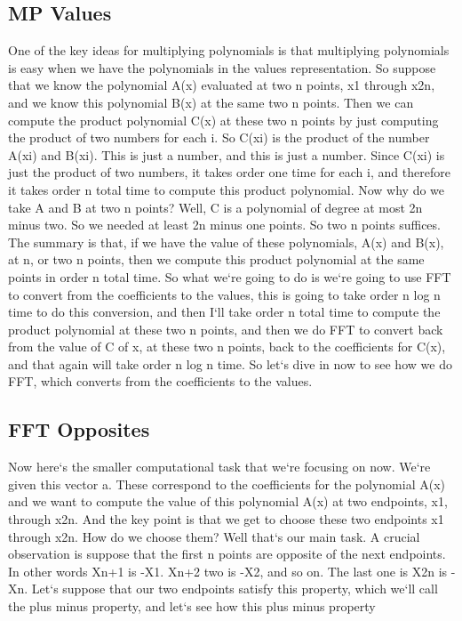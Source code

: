 \subsection{MP  Values}
One of the key ideas for multiplying polynomials is that multiplying polynomials is easy when we have the polynomials in the values representation.
So suppose that we know the polynomial A(x) evaluated at two n points, x1 through x2n, and we know this polynomial B(x) at the same two n points.
Then we can compute the product polynomial C(x) at these two n points by just computing the product of two numbers for each i.
So C(xi) is the product of the number A(xi) and B(xi).
This is just a number, and this is just a number.
Since C(xi) is just the product of two numbers, it takes order one time for each i, and therefore it takes order n total time to compute this product polynomial.
Now why do we take A and B at two n points? Well, C is a polynomial of degree at most 2n minus two.
So we needed at least 2n minus one points.
So two n points suffices.
The summary is that, if we have the value of these polynomials, A(x) and B(x), at n, or two n points, then we compute this product polynomial at the same points in order n total time.
So what we`re going to do is we`re going to use FFT to convert from the coefficients to the values, this is going to take order n log n time to do this conversion, and then I`ll take order n total time to compute the product polynomial at these two n points, and then we do FFT to convert back from the value of C of x, at these two n points, back to the coefficients for C(x), and that again will take order n log n time.
So let`s dive in now to see how we do FFT, which converts from the coefficients to the values.

\subsection{FFT  Opposites}
Now here`s the smaller computational task that we`re focusing on now.
We`re given this vector a.
These correspond to the coefficients for the polynomial A(x) and we want to compute the value of this polynomial A(x) at two endpoints, x1, through x2n.
And the key point is that we get to choose these two endpoints x1 through x2n.
How do we choose them? Well that`s our main task.
A crucial observation is suppose that the first n points are opposite of the next endpoints.
In other words Xn+1 is -X1.
Xn+2 two is -X2, and so on.
The last one is X2n is -Xn.
Let`s suppose that our two endpoints satisfy this property, which we`ll call the plus minus property, and let`s see how this plus minus property

